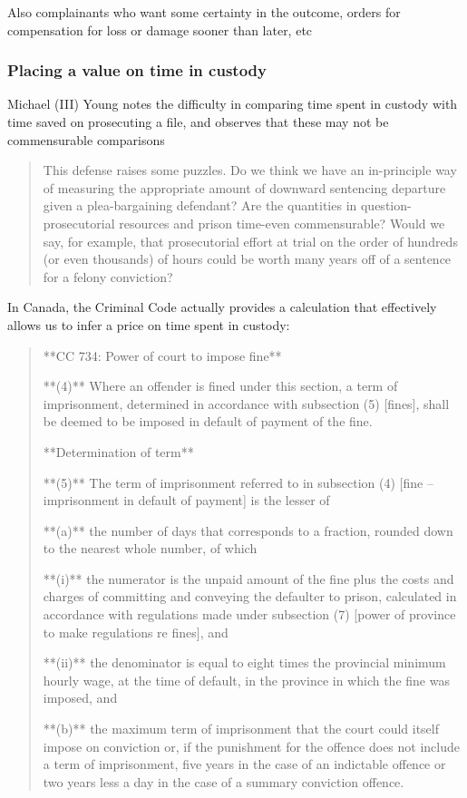 Also complainants who want some certainty in the outcome, orders for compensation for loss or damage sooner than later, etc

\subsubsection{Placing a value on time in custody}

Michael (III) Young notes the difficulty in comparing time spent in custody with time saved on prosecuting a file, and observes that these may not be commensurable comparisons

\begin{quote}
    This defense raises some puzzles. Do we think we have an in-principle way of measuring the appropriate amount of downward sentencing departure given a plea-bargaining defendant? Are the quantities in question-prosecutorial resources and prison time-even commensurable? Would we say, for example, that prosecutorial effort at trial on the order of hundreds (or even thousands) of hours could be worth many years off of a sentence for a felony conviction?
\end{quote}

In Canada, the Criminal Code actually provides a calculation that effectively allows us to infer a price on time spent in custody:

\begin{quote}
    **CC 734: Power of court to impose fine**
    
    **(4)** Where an offender is fined under this section, a term of imprisonment, determined in accordance with subsection (5) [fines], shall be deemed to be imposed in default of payment of the fine.
    
    **Determination of term**
    
    **(5)** The term of imprisonment referred to in subsection (4) [fine – imprisonment in default of payment] is the lesser of
    
        **(a)** the number of days that corresponds to a fraction, rounded down to the nearest whole number, of which
        
            **(i)** the numerator is the unpaid amount of the fine plus the costs and charges of committing and conveying the defaulter to prison, calculated in accordance with regulations made under subsection (7) [power of province to make regulations re fines], and
            
            **(ii)** the denominator is equal to eight times the provincial minimum hourly wage, at the time of default, in the province in which the fine was imposed, and
        
        **(b)** the maximum term of imprisonment that the court could itself impose on conviction or, if the punishment for the offence does not include a term of imprisonment, five years in the case of an indictable offence or two years less a day in the case of a summary conviction offence.

\end{quote}

